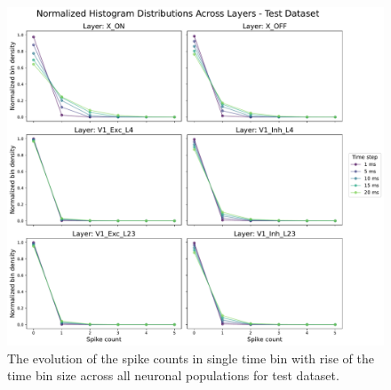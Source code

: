 \begin{figure}
    \centering
    \includegraphics[width=\linewidth]{img/plots/time_step_counts_test.pdf}
    \caption{The evolution of the spike counts in single time bin with rise of the time bin size across all neuronal populations for test dataset.}
    \label{fig:spike_count_distribution_test}
\end{figure}